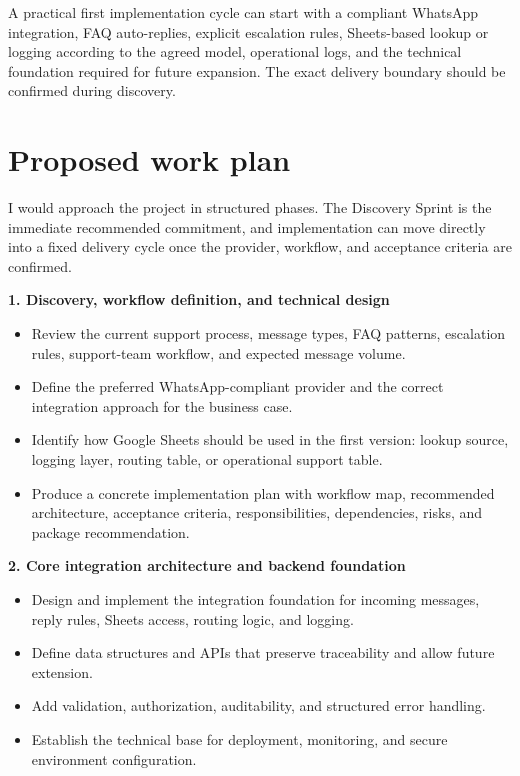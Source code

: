 \documentclass[11pt,a4paper]{article}
\begin{document}
A practical first implementation cycle can start with a compliant WhatsApp integration, FAQ auto-replies, explicit escalation rules, Sheets-based lookup or logging according to the agreed model, operational logs, and the technical foundation required for future expansion. The exact delivery boundary should be confirmed during discovery.\par

\section*{Proposed work plan}

I would approach the project in structured phases. The Discovery Sprint is the immediate recommended commitment, and implementation can move directly into a fixed delivery cycle once the provider, workflow, and acceptance criteria are confirmed.\par

\textbf{1. Discovery, workflow definition, and technical design}\par

\begin{itemize}
\item Review the current support process, message types, FAQ patterns, escalation rules, support-team workflow, and expected message volume.
\item Define the preferred WhatsApp-compliant provider and the correct integration approach for the business case.
\item Identify how Google Sheets should be used in the first version: lookup source, logging layer, routing table, or operational support table.
\item Produce a concrete implementation plan with workflow map, recommended architecture, acceptance criteria, responsibilities, dependencies, risks, and package recommendation.
\end{itemize}

\textbf{2. Core integration architecture and backend foundation}\par

\begin{itemize}
\item Design and implement the integration foundation for incoming messages, reply rules, Sheets access, routing logic, and logging.
\item Define data structures and APIs that preserve traceability and allow future extension.
\item Add validation, authorization, auditability, and structured error handling.
\item Establish the technical base for deployment, monitoring, and secure environment configuration.
\end{itemize}
\end{document}
